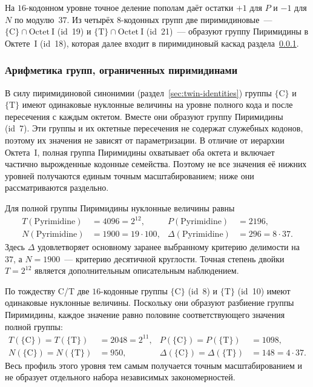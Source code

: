\documentclass[11pt,a4paper]{article}
\renewcommand{\_}{\origunderscore\allowbreak}
\begin{document}
На $16$-кодонном уровне точное деление пополам даёт остатки $+1$ для
$P$ и $-1$ для $N$ по модулю~$37$.
Из четырёх $8$-кодонных групп две пиримидиновые~---
$\{\mathrm{C}\} \cap \mathrm{Octet~I}$ (id~19) и
$\{\mathrm{T}\} \cap \mathrm{Octet~I}$ (id~21)~--- образуют группу
Пиримидины в Октете~I (id~18), которая далее входит в пиримидиновый
каскад раздела~\ref{sec:results-pyrimidine}.

\subsubsection{Арифметика групп, ограниченных пиримидинами}
\label{sec:results-pyrimidine}

В силу пиримидиновой синонимии
(раздел~\ref{sec:twin-identities}) группы $\{\mathrm{C}\}$ и
$\{\mathrm{T}\}$ имеют одинаковые нуклонные величины на уровне
полного кода и после пересечения с каждым октетом. Вместе они образуют
группу Пиримидины (id~7). Эти группы и их октетные пересечения не
содержат служебных кодонов, поэтому их значения не зависят от
параметризации. В отличие от иерархии Октета~I, полная группа
Пиримидины охватывает оба октета и включает частично вырожденные
кодонные семейства. Поэтому не все значения её нижних уровней
получаются единым точным масштабированием; ниже они рассматриваются
раздельно.

Для полной группы Пиримидины нуклонные величины равны
\[
\begin{aligned}
T(\mathrm{Pyrimidine}) &= 4096 = 2^{12}, &
P(\mathrm{Pyrimidine}) &= 2196, \\
N(\mathrm{Pyrimidine}) &= 1900 = 19 \cdot 100, &
\Delta(\mathrm{Pyrimidine}) &= 296 = 8 \cdot 37.
\end{aligned}
\]
Здесь $\Delta$ удовлетворяет основному заранее выбранному критерию
делимости на~$37$, а $N = 1900$~--- критерию десятичной круглости.
Точная степень двойки $T = 2^{12}$ является дополнительным описательным
наблюдением.

По тождеству C/T две $16$-кодонные группы $\{\mathrm{C}\}$ (id~8) и
$\{\mathrm{T}\}$ (id~10) имеют одинаковые нуклонные величины.
Поскольку они образуют разбиение группы Пиримидины, каждое значение
равно половине соответствующего значения полной группы:
\[
\begin{aligned}
T(\{\mathrm{C}\}) = T(\{\mathrm{T}\})
  &= 2048 = 2^{11}, &
P(\{\mathrm{C}\}) = P(\{\mathrm{T}\})
  &= 1098, \\
N(\{\mathrm{C}\}) = N(\{\mathrm{T}\})
  &= 950, &
\Delta(\{\mathrm{C}\}) = \Delta(\{\mathrm{T}\})
  &= 148 = 4 \cdot 37.
\end{aligned}
\]
Весь профиль этого уровня тем самым получается точным масштабированием
и не образует отдельного набора независимых закономерностей.
\end{document}

